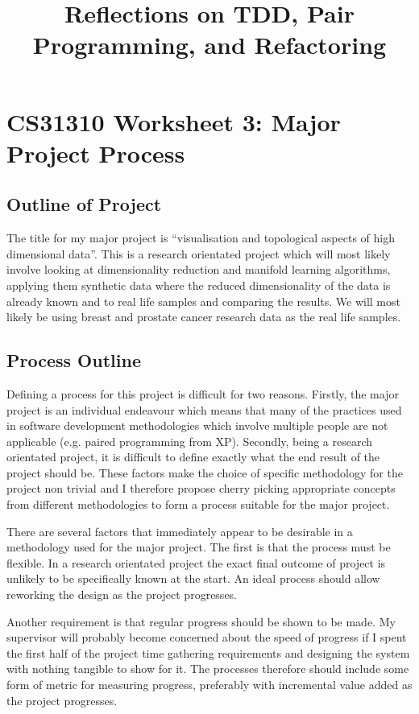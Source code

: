 \documentclass[paper=a4, fontsize=11pt]{scrartcl}	%
\title{
	\vspace{-0.5in}
	\usefont{OT1}{bch}{b}{n}
	 Reflections on TDD, Pair Programming, and Refactoring
}
\author{}
\date{}
\numberwithin{equation}{section} %
\numberwithin{figure}{section} %
\numberwithin{table}{section}
\begin{document}
\section*{CS31310 Worksheet 3: Major Project Process}

\subsection*{Outline of Project}
The title for my major project is ``visualisation and topological aspects of high dimensional data''. This is a research orientated project which will most likely involve looking at dimensionality reduction and manifold learning algorithms, applying them synthetic data where the reduced dimensionality of the data is already known and to real life samples and comparing the results. We will most likely be using breast and prostate cancer research data as the real life samples.

\subsection*{Process Outline}
Defining a process for this project is difficult for two reasons. Firstly, the major project is an individual endeavour which means that many of the practices used in software development methodologies which involve multiple people are not applicable (e.g. paired programming from XP). Secondly, being a research orientated project, it is difficult to define exactly what the end result of the project should be. These factors make the choice of specific methodology for the project non trivial and I therefore propose cherry picking appropriate concepts from different methodologies to form a process suitable for the major project.

There are several factors that immediately appear to be desirable in a methodology used for the major project. The first is that the process must be flexible. In a research orientated project the exact final outcome of project is unlikely to be specifically known at the start. An ideal process should allow reworking the design as the project progresses.

Another requirement is that regular progress should be shown to be made. My supervisor will probably become concerned about the speed of progress if I spent the first half of the project time gathering requirements and designing the system with nothing tangible to show for it. The processes therefore should include some form of metric for measuring progress, preferably with incremental value added as the project progresses.
\end{document}
